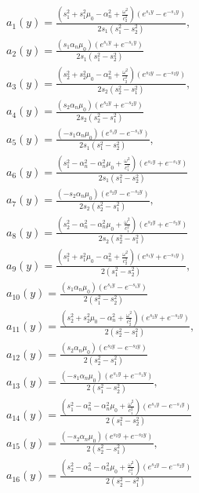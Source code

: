 \begin{align*}\tag{Aп.C. 3}\label{ap_c_def_dynamic}
    &a_1(y) = \frac{(s_1^2 + s_1^2 \mu_0 - \alpha_n^2 + \frac{\omega^2}{c_2^2}) (e^{s_1 y} - e^{-s_1 y})}{2 s_1 (s_1^2 - s_2^2)}, \\ 
    &a_2(y) = \frac{(s_1 \alpha_n \mu_0) (e^{s_1 y} + e^{-s_1 y})}{2 s_1 (s_1^2 - s_2^2)} \\
    &a_3(y) = \frac{(s_2^2 + s_2^2 \mu_0 - \alpha_n^2 + \frac{\omega^2}{c_2^2}) (e^{s_2 y} - e^{-s_2 y})}{2 s_2 (s_2^2 - s_1^2)}, \\
    &a_4(y) = \frac{(s_2 \alpha_n \mu_0) (e^{s_2 y} + e^{-s_2 y})}{2 s_2 (s_2^2 - s_1^2)} \\
    &a_5(y) = \frac{(-s_1 \alpha_n \mu_0) (e^{s_1 y} - e^{-s_1 y})}{2 s_1 (s_1^2 - s_2^2)}, \\
    &a_6(y) = \frac{(s_1^2 - \alpha_n^2 - \alpha_n^2\mu_0 + \frac{\omega^2}{c_1^2}) (e^{s_1 y} + e^{-s_1 y})}{2 s_1 (s_1^2 - s_2^2)} \\
    &a_7(y) = \frac{(-s_2 \alpha_n \mu_0) (e^{s_2 y} - e^{-s_2 y})}{2 s_2 (s_2^2 - s_1^2)}, \\
    &a_8(y) = \frac{(s_2^2 - \alpha_n^2 - \alpha_n^2\mu_0 + \frac{\omega^2}{c_1^2}) (e^{s_2 y} + e^{-s_2 y})}{2 s_2 (s_2^2 - s_1^2)} \\
    &a_9(y) = \frac{(s_1^2 + s_1^2 \mu_0 - \alpha_n^2 + \frac{\omega^2}{c_2^2}) (e^{s_1 y} + e^{-s_1 y})}{2 (s_1^2 - s_2^2)}, \\
    &a_{10}(y) = \frac{(s_1 \alpha_n \mu_0) (e^{s_1 y} - e^{-s_1 y})}{2 (s_1^2 - s_2^2)} \\
    &a_{11}(y) = \frac{(s_2^2 + s_2^2 \mu_0 - \alpha_n^2 + \frac{\omega^2}{c_2^2}) (e^{s_2 y} + e^{-s_2 y})}{2 (s_2^2 - s_1^2)}, \\ 
    &a_{12}(y) = \frac{(s_2 \alpha_n \mu_0) (e^{s_2 y} - e^{-s_2 y})}{2 (s_2^2 - s_1^2)} \\
    &a_{13}(y) = \frac{(-s_1 \alpha_n \mu_0) (e^{s_1 y} + e^{-s_1 y})}{2 (s_1^2 - s_2^2)}, \\ 
    &a_{14}(y) = \frac{(s_1^2 - \alpha_n^2 - \alpha_n^2\mu_0 + \frac{\omega^2}{c_1^2}) (e^{s_1 y} - e^{-s_1 y})}{2 (s_1^2 - s_2^2)} \\
    &a_{15}(y) = \frac{(-s_2 \alpha_n \mu_0) (e^{s_2 y} + e^{-s_2 y})}{2 (s_2^2 - s_1^2)}, \\ 
    &a_{16}(y) = \frac{(s_2^2 - \alpha_n^2 - \alpha_n^2\mu_0 + \frac{\omega^2}{c_1^2}) (e^{s_2 y} - e^{-s_2 y})}{2 (s_2^2 - s_1^2)}
\end{align*}

